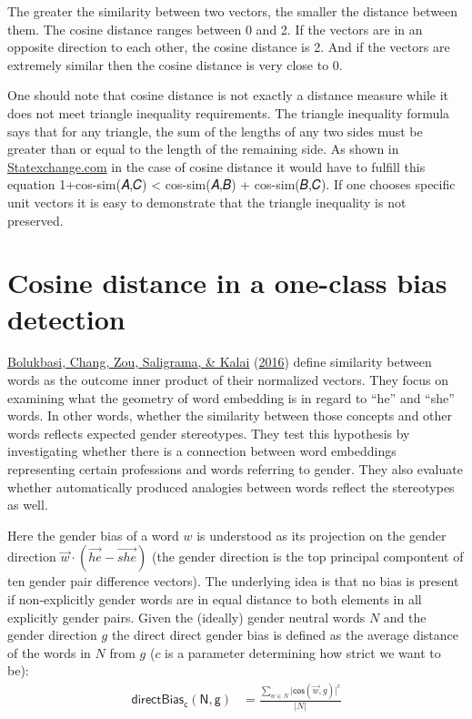 \documentclass[
  12pt,
]{book}
\begin{document}
The greater the similarity between two vectors, the smaller the distance between them. The cosine distance ranges between 0 and 2. If the vectors are in an opposite direction to each other, the cosine distance is 2. And if the vectors are extremely similar then the cosine distance is very close to 0.

One should note that cosine distance is not exactly a distance measure while it does not meet triangle inequality requirements. The triangle inequality formula says that for any triangle, the sum of the lengths of any two sides must be greater than or equal to the length of the remaining side. As shown in \href{https://stats.stackexchange.com/questions/198080/proving-that-cosine-distance-function-defined-by-cosine-similarity-between-two-u}{Statexchange.com} in the case of cosine distance it would have to fulfill this equation 1+cos-sim(𝐴,𝐶) \textless{} cos-sim(𝐴,𝐵) + cos-sim(𝐵,𝐶). If one chooses specific unit vectors it is easy to demonstrate that the triangle inequality is not preserved.

\hypertarget{cosine-distance-in-a-one-class-bias-detection}{%
\section{Cosine distance in a one-class bias detection}\label{cosine-distance-in-a-one-class-bias-detection}}

\protect\hyperlink{ref-Bolukbasi2016Man}{Bolukbasi, Chang, Zou, Saligrama, \& Kalai} (\protect\hyperlink{ref-Bolukbasi2016Man}{2016}) define similarity between words as the outcome inner product of their normalized vectors.
They focus on examining what the geometry of word embedding is in regard to ``he'' and ``she'' words. In other words, whether the similarity between those concepts and other words reflects expected gender stereotypes. They test this hypothesis by investigating whether there is a connection between word embeddings representing certain professions and words referring to gender. They also evaluate whether automatically produced analogies between words reflect the stereotypes as well.

Here the gender bias of a word \(w\) is understood as its projection on the gender direction \(\vec{w} \cdot (\overrightarrow{he} - \overrightarrow{she})\) (the gender direction is the top principal compontent of ten gender pair difference vectors). The underlying idea is that no bias is present if non-explicitly gender words are in equal distance to both elements in all explicitly gender pairs. Given the (ideally) gender neutral words \(N\) and the gender direction \(g\) the direct direct gender bias is defined as the average distance of the words in \(N\) from \(g\) (\(c\) is a parameter determining how strict we want to be):
\begin{align}
\mathsf{directBias_c(N,g)} & = \frac{\sum_{w\in N}\vert \mathsf{cos}(\vec{w},g)\vert^c}{\vert N \vert }
\end{align}
\end{document}
